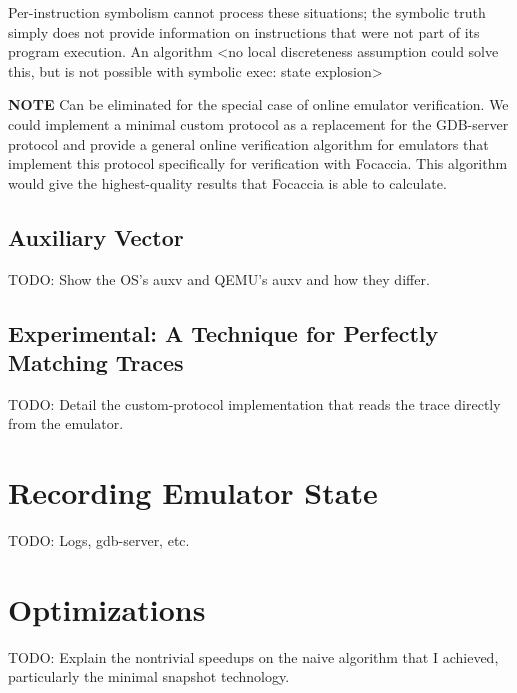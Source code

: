 Per-instruction symbolism cannot process these situations; the symbolic truth simply does not provide information on
instructions that were not part of its program execution. An algorithm <no local discreteness assumption could solve
this, but is not possible with symbolic exec: state explosion>

\textbf{NOTE} Can be eliminated for the special case of online emulator verification. We could implement a minimal
custom protocol as a replacement for the GDB-server protocol and provide a general online verification algorithm for
emulators that implement this protocol specifically for verification with Focaccia. This algorithm would give the
highest-quality results that Focaccia is able to calculate.

\subsection{Auxiliary Vector}\label{sec:auxv}

TODO: Show the OS's auxv and QEMU's auxv and how they differ.

\subsection{Experimental: A Technique for Perfectly Matching Traces}

TODO: Detail the custom-protocol implementation that reads the trace directly from the emulator.

\section{Recording Emulator State}

TODO: Logs, gdb-server, etc.

\section{Optimizations}

TODO: Explain the nontrivial speedups on the naive algorithm that I achieved, particularly the minimal snapshot
technology.



%
%
%
